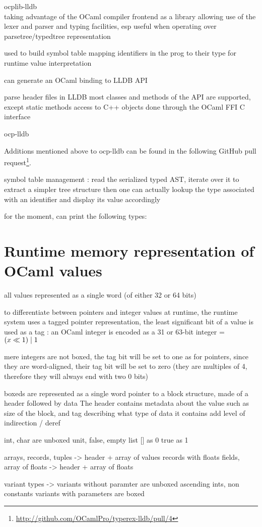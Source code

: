 
ocplib-lldb \\

taking advantage of the OCaml compiler frontend as a library
allowing use of the lexer and parser and typing facilities, esp
useful when operating over parsetree/typedtree representation

used to build symbol table mapping identifiers in the prog to their type
for runtime value interpretation

can generate an OCaml binding to LLDB API

parse header files in LLDB
most classes and methods of the API are supported, except static methods
access to C++ objects done through the OCaml FFI C interface

ocp-lldb

Additions mentioned above to ocp-lldb can be found in the following GitHub pull
request\footnote{\url{http://github.com/OCamlPro/typerex-lldb/pull/4}}.

symbol table management :
read the serialized typed AST, iterate over it to extract a simpler tree
structure
then one can actually lookup the type associated with an identifier and display
its value accordingly

for the moment, can print the following types:

\section{Runtime memory representation of OCaml values}

all values represented as a single word (of either 32 or 64 bits)

to differentiate between pointers and integer values at runtime, the runtime
system uses a tagged pointer representation, the least significant bit of a
value is used as a tag : an OCaml integer is encoded as a 31 or 63-bit integer = $ (x \ll 1) \mathrel{|} 1 $

mere integers are not boxed, the tag bit will be set to one
as for pointers, since they are word-aligned, their tag bit will be set to zero
(they are multiples of 4, therefore they will always end with two 0 bits)

\Glspl{boxed} are represented as a single word pointer to a block structure, made of a
header followed by data
The header contains metadata about the value such as size of the block, and tag describing what type of data it
contains
add level of indirection / deref


int, char are unboxed
unit, false, empty list [] as 0
true as 1

arrays, records, tuples -> header + array of values
records with floats fields, array of floats -> header + array of floats

variant types -> variants without paramter are unboxed ascending ints, non
constants variants with parameters are boxed
